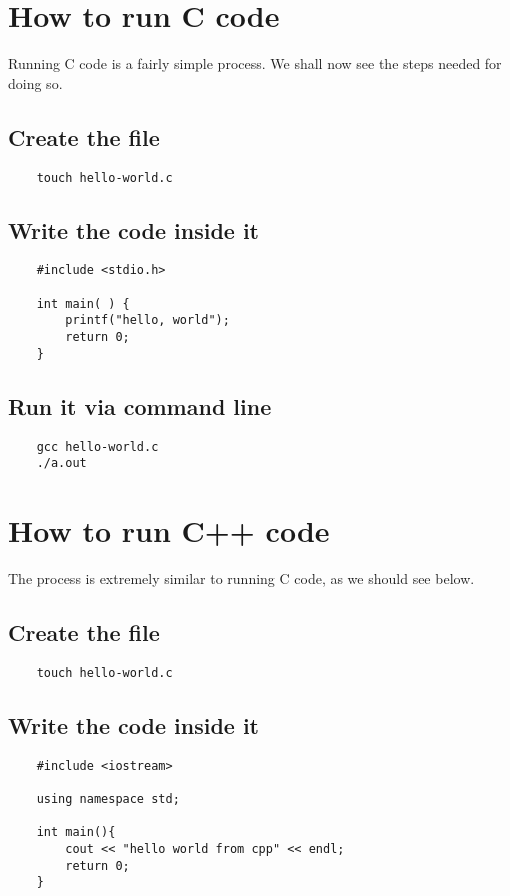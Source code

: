 \documentclass{article}
\begin{document}
\section{How to run C code}
Running C code is a fairly simple process. We shall now see the steps needed for doing so.

\subsection{Create the file}
\begin{verbatim}
    touch hello-world.c
\end{verbatim}

\subsection{Write the code inside it}
\begin{verbatim}
    #include <stdio.h>

    int main( ) {
        printf("hello, world");
        return 0;
    }
\end{verbatim}

\subsection{Run it via command line}
\begin{verbatim}
    gcc hello-world.c 
    ./a.out 
\end{verbatim}

\section{How to run C++ code}
The process is extremely similar to running C code, as we should see below.

\subsection{Create the file}
\begin{verbatim}
    touch hello-world.c
\end{verbatim}

\subsection{Write the code inside it}
\begin{verbatim}
    #include <iostream>

    using namespace std;

    int main(){
        cout << "hello world from cpp" << endl;
        return 0;
    }
\end{verbatim}
\end{document}
